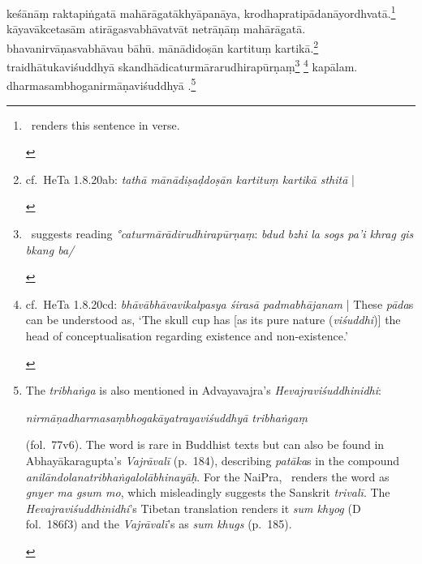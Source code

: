 \documentclass[naipra.tex]{subfiles}
\begin{document}
\begin{sanskrit}

\medskip\pstart
keśānāṃ raktapiṅgatā mahārāgatākhyāpanāya, krodhapratipādanāyordhvatā.\footnote{
	\begin{english}%
		\TIB\ renders this sentence in verse.
	\end{english}
}
kāyavākcetasām atirāgasvabhāvatvāt  netrāṇāṃ mahārāgatā.
bhavanirvāṇasvabhāvau bāhū.
mānādidoṣān kartituṃ kartikā.\footnote{
	\begin{english}%
		cf.\ HeTa 1.8.20ab: \emph{tathā mānādiṣaḍdoṣān kartituṃ kartikā sthitā} |
	\end{english}
}
traidhātukaviśuddhyā skandhādicaturmārarudhirapūrṇaṃ\footnote{
	\begin{english}%
		\TIB\ suggests reading \emph{°caturmārādirudhirapūrṇaṃ}: \emph{bdud bzhi la sogs pa'i khrag gis bkang ba/} 
	\end{english}
}  \footnote{
	\begin{english}%
		cf.\ HeTa 1.8.20cd: \emph{bhāvābhāvavikalpasya śirasā padmabhājanam} | These \emph{pāda}s can be understood as, `The skull cup has [as its pure nature (\emph{viśuddhi})] the head of conceptualisation regarding existence and non-existence.'
	\end{english}
} kapālam.
dharmasambhoganirmāṇaviśuddhyā .\footnote{
	\begin{english}%
		The \emph{tribhaṅga} is also mentioned in Advayavajra's \emph{Hevajraviśuddhinidhi}: \begin{sanskrit}\emph{nirmāṇadharmasaṃbhogakāyatrayaviśuddhyā tribhaṅgaṃ}\end{sanskrit} (fol.\ 77v6).
		The word is rare in Buddhist texts but can also be found in Abhayākaragupta's \emph{Vajrāvalī} (p.\ 184), describing \emph{patāka}s in the compound \emph{anilāndolanatribhaṅgalolābhinayāḥ}.
		For the NaiPra, \TIB\ renders the word as \emph{gnyer ma gsum mo}, which misleadingly suggests the Sanskrit \emph{trivalī}.
		The \emph{Hevajraviśuddhinidhi}'s Tibetan translation renders it \emph{sum khyog} (D fol.\ 186f3) and the \emph{Vajrāvalī}'s as \emph{sum khugs} (p.\ 185).

\end{english}}
\end{sanskrit}
\end{document}
